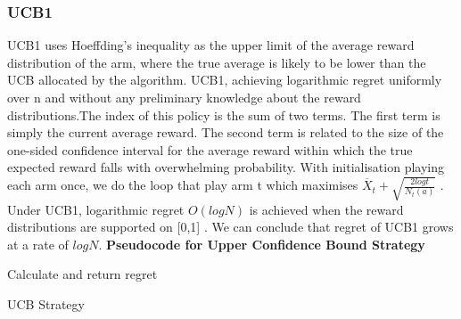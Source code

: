 {    \subsubsection{UCB1}
    UCB1 uses Hoeffding's inequality as the upper limit of the average reward distribution of the arm, where the true average is likely to be lower than the UCB allocated by the algorithm.
    UCB1, achieving logarithmic regret uniformly over n and without any preliminary knowledge about the reward distributions.The index of this policy is the sum of two terms.
    The first term is simply the current average reward.
    The second term is related to the size of the one-sided confidence interval for the average reward within which the true expected reward falls with overwhelming probability.
    With initialisation playing each arm once, we do the loop that play arm t which maximises $\overline X_t + \sqrt{\frac{2log t}{N_t (a)}}$ . \citep{Auer2002}
    \\Under UCB1, logarithmic regret $O(logN)$  is achieved when the reward distributions are supported on [0,1] \citep{Chan_2020}.
    We can conclude that regret of UCB1 grows at a rate of $log N$.
    \newline
    \textbf{Pseudocode for Upper Confidence Bound Strategy}
    \newline
    \begin{algorithm}[H]
        Calculate and return regret
    \caption{UCB Strategy}\label{alg:ucb_algorithm}
\end{algorithm}

}
